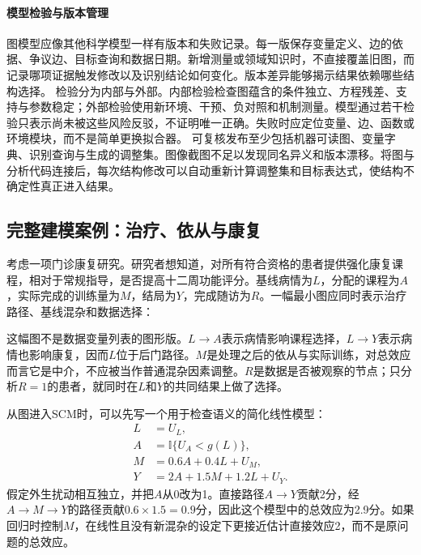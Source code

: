 \paragraph{模型检验与版本管理}

图模型应像其他科学模型一样有版本和失败记录。每一版保存变量定义、边的依据、争议边、目标查询和数据日期。新增测量或领域知识时，不直接覆盖旧图，而记录哪项证据触发修改以及识别结论如何变化。版本差异能够揭示结果依赖哪些结构选择。
检验分为内部与外部。内部检验检查图蕴含的条件独立、方程残差、支持与参数稳定；外部检验使用新环境、干预、负对照和机制测量。模型通过若干检验只表示尚未被这些风险反驳，不证明唯一正确。失败时应定位变量、边、函数或环境模块，而不是简单更换拟合器。
可复核发布至少包括机器可读图、变量字典、识别查询与生成的调整集。图像截图不足以发现同名异义和版本漂移。将图与分析代码连接后，每次结构修改可以自动重新计算调整集和目标表达式，使结构不确定性真正进入结果。

\subsection{完整建模案例：治疗、依从与康复}

考虑一项门诊康复研究。研究者想知道，对所有符合资格的患者提供强化康复课程，相对于常规指导，是否提高十二周功能评分。基线病情为$L$，分配的课程为$A$，实际完成的训练量为$M$，结局为$Y$，完成随访为$R$。一幅最小图应同时表示治疗路径、基线混杂和数据选择：

\begin{center}
\end{center}

这幅图不是数据变量列表的图形版。$L\rightarrow A$表示病情影响课程选择，$L\rightarrow Y$表示病情也影响康复，因而$L$位于后门路径。$M$是处理之后的依从与实际训练，对总效应而言它是中介，不应被当作普通混杂因素调整。$R$是数据是否被观察的节点；只分析$R=1$的患者，就同时在$L$和$Y$的共同结果上做了选择。

从图进入SCM时，可以先写一个用于检查语义的简化线性模型：
\begin{align*}
L&=U_L,\\
A&=\mathbb I\{U_A<g(L)\},\\
M&=0.6A+0.4L+U_M,\\
Y&=2A+1.5M+1.2L+U_Y.
\end{align*}
假定外生扰动相互独立，并把$A$从0改为1。直接路径$A\rightarrow Y$贡献2分，经$A\rightarrow M\rightarrow Y$的路径贡献$0.6\times1.5=0.9$分，因此这个模型中的总效应为2.9分。如果回归时控制$M$，在线性且没有新混杂的设定下更接近估计直接效应2，而不是原问题的总效应。

